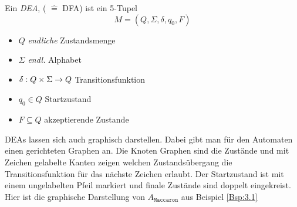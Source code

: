 \begin{Def}
        Ein \emph{\acf{DEA}}, ( $\hat=$ \acl{DFA}) ist ein 5-Tupel
        \[ M= (Q,\Sigma,\delta,q_0,F) \]
        \begin{itemize}
                \item $Q$ \emph{endliche} Zustandsmenge
                \item $\Sigma$ \emph{endl.} Alphabet
                \item $\delta:Q\x\Sigma\->Q$ Transitionsfunktion
                \item $q_0\in Q$ Startzustand
                \item $F\subseteq Q$ akzeptierende Zustande
        \end{itemize}
\end{Def}

DEAs lassen sich auch graphisch darstellen.
Dabei gibt man für den Automaten einen gerichteten Graphen an.
Die Knoten Graphen sind die Zustände und mit Zeichen gelabelte Kanten zeigen welchen Zustandsübergang die Transitionsfunktion für das nächste Zeichen erlaubt.
Der Startzustand ist mit einem ungelabelten Pfeil markiert und finale Zustände sind doppelt eingekreist.
Hier ist die graphische Darstellung von $A_{\mathtt{Maccaron}}$ aus Beispiel \ref{Bsp:3.1}

\begin{center}
\end{center}

